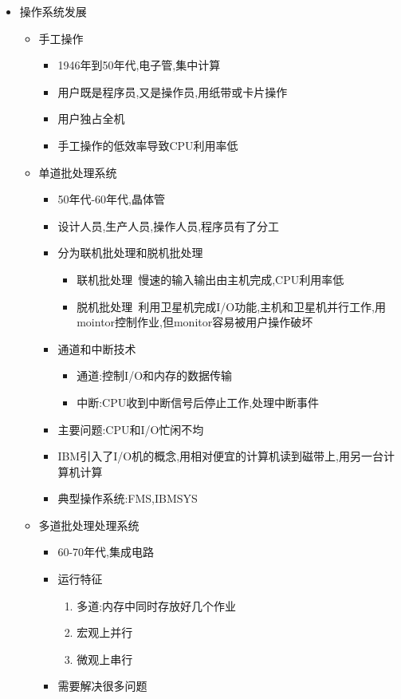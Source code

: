 \documentclass[a4paper,10pt,notitlepage]{article}
\begin{document}
\begin{itemize}
	\item 操作系统发展
	\begin{itemize}
		\item 手工操作
		\begin{itemize}
			\item 1946年到50年代,电子管,集中计算
			\item 用户既是程序员,又是操作员,用纸带或卡片操作
			\item 用户独占全机
			\item 手工操作的低效率导致CPU利用率低
		\end{itemize}
		\item 单道批处理系统
		\begin{itemize}
			\item 50年代-60年代,晶体管
			\item 设计人员,生产人员,操作人员,程序员有了分工
			\item 分为联机批处理和脱机批处理
			\begin{itemize}
				\item 联机批处理\ 慢速的输入输出由主机完成,CPU利用率低
				\item 脱机批处理\ 利用卫星机完成I/O功能,主机和卫星机并行工作,用mointor控制作业,但monitor容易被用户操作破坏
			\end{itemize}
			\item 通道和中断技术
			\begin{itemize}
				\item 通道:控制I/O和内存的数据传输
				\item 中断:CPU收到中断信号后停止工作,处理中断事件
			\end{itemize}
			\item 主要问题:CPU和I/O忙闲不均
			\item IBM引入了I/O机的概念,用相对便宜的计算机读到磁带上,用另一台计算机计算
			\item 典型操作系统:FMS,IBMSYS
		\end{itemize}
		\item 多道批处理处理系统
		\begin{itemize}
			\item 60-70年代,集成电路
			\item 运行特征
			\begin{enumerate}
				\item 多道:内存中同时存放好几个作业
				\item 宏观上并行
				\item 微观上串行
			\end{enumerate}
			\item 需要解决很多问题

\end{itemize}
\end{itemize}
\end{itemize}
\end{document}
